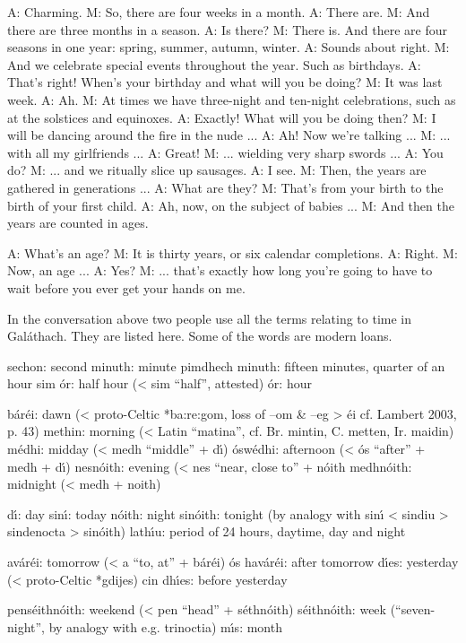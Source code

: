 A: Charming.
M: So, there are four weeks in a month.
A: There are.
M: And there are three months in a season.
A: Is there?
M: There is. And there are four seasons in one year: spring, summer, autumn, winter.
A: Sounds about right.
M: And we celebrate special events throughout the year. Such as birthdays.
A: That’s right! When’s your birthday and what will you be doing?
M: It was last week.
A: Ah.
M: At times we have three-night and ten-night celebrations, such as at the solstices and equinoxes.
A: Exactly! What will you be doing then?
M: I will be dancing around the fire in the nude ...
A: Ah! Now we’re talking ...
M: ... with all my girlfriends ...
A: Great!
M: ... wielding very sharp swords ...
A: You do?
M: ... and we ritually slice up sausages.
A: I see.
M: Then, the years are gathered in generations ...
A: What are they?
M: That’s from your birth to the birth of your first child.
A: Ah, now, on the subject of babies ...
M: And then the years are counted in ages.

A: What’s an age?
M: It is thirty years, or six calendar completions.
A: Right.
M: Now, an age ...
A: Yes?
M: ... that’s exactly how long you’re going to have to wait before you ever get your hands on me.

In the conversation above two people use all the terms relating to time in Gal\'{a}thach. They are listed here. Some of the words are modern loans.

sechon: second 
minuth: minute 
pimdhech minuth: fifteen minutes, quarter of an hour 
sim \'{o}r: half hour (< sim “half”, attested)
\'{o}r: hour 

b\'{a}r\'{e}i: dawn (< proto-Celtic *ba:re:gom, loss of –om \& –eg > \'{e}i cf. Lambert 2003, p. 43)
methin: morning (< Latin “matina”, cf. Br. mintin, C. metten, Ir. maidin)
m\'{e}dhi: midday (< medh “middle” + d\'{\i})
\'{o}sw\'{e}dhi: afternoon (< \'{o}s “after” + medh + d\'{\i})
nesn\'{o}ith: evening (< nes “near, close to” + n\'{o}ith
medhn\'{o}ith: midnight (< medh + noith)

d\'{\i}: day
sin\'{\i}: today
n\'{o}ith: night
sin\'{o}ith: tonight (by analogy with sin\'{\i} < sindiu > sindenocta > sin\'{o}ith)
lath\'{\i}u: period of 24 hours, daytime, day and night

av\'{a}r\'{e}i: tomorrow (< a “to, at” + b\'{a}r\'{e}i)
\'{o}s hav\'{a}r\'{e}i: after tomorrow
d\'{\i}es: yesterday (< proto-Celtic *gdijes)
cin dh\'{\i}es: before yesterday

pens\'{e}ithn\'{o}ith: weekend (< pen “head” + s\'{e}thn\'{o}ith)
s\'{e}ithn\'{o}ith: week (“seven-night”, by analogy with e.g. trinoctia)
m\'{\i}s: month

